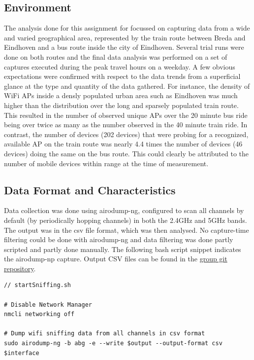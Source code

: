\documentclass[letterpaper, 10 pt, conference]{ieeeconf}  %
\begin{document}
\subsection{Environment}
The analysis done for this assignment for focussed on capturing data from a wide and varied geographical area, represented by the train route between Breda and Eindhoven and a bus route inside the city of Eindhoven. Several trial runs were done on both routes and the final data analysis was performed on a set of captures executed during the peak travel hours on a weekday. A few obvious expectations were confirmed with respect to the data trends from a superficial glance at the type and quantity of the data gathered. For instance, the density of WiFi APs inside a densly populated urban area such as Eindhoven was much higher than the distribution over the long and sparsely populated train route. This resulted in the number of observed unique APs over the 20 minute bus ride being over twice as many as the number observed in the 40 minute train ride. In contrast, the number of devices (202 devices) that were probing for a recognized, available AP on the train route was nearly 4.4 times the number of devices (46 devices) doing the same on the bus route. This could clearly be attributed to the number of mobile devices within range at the time of measurement. 
\subsection{Data Format and Characteristics}
Data collection was done using airodump-ng, configured to scan all channels by default (by periodically hopping channels) in both the 2.4GHz and 5GHz bands. The output was in the csv file format, which was then analysed. No capture-time filtering could be done with airodump-ng and data filtering was done partly scripted and partly done manually. The following bash script snippet indicates the airodump-np capture. Output CSV files can be found in the \href{https://github.com/HOkkerman/ET4394/tree/master/wireshark_airodump_captures/airodump}{group git repository}.
\begin{lstlisting}
// startSniffing.sh

# Disable Network Manager
nmcli networking off

# Dump wifi sniffing data from all channels in csv format
sudo airodump-ng -b abg -e --write $output --output-format csv $interface

\end{lstlisting}
 
\end{document}
